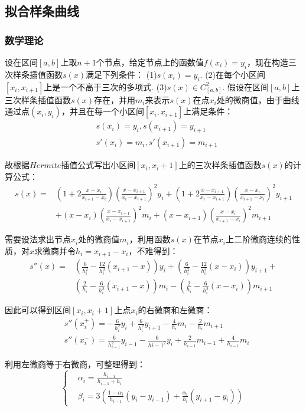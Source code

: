 \documentclass{article}
\begin{document}
	\subsection{拟合样条曲线}
	\subsubsection{数学理论}
	设在区间$[a,b]$上取$n+1$个节点，给定节点上的函数值$f(x_i)=y_i$，现在构造三次样条插值函数$s(x)$满足下列条件：
	(1)$s(x_i)=y_i.$
	(2)在每个小区间$[x_i,x_{i+1}]$上是一个不高于三次的多项式.
	(3)$s(x)∈C_{[a,b]}^2$.
	假设在区间$[a,b]$上三次样条插值函数$s(x)$存在，并用$m_i$来表示$s(x)$在点$x_i$处的微商值，由于曲线通过点$(x_i,y_i)$，并且在每一个小区间$[x_i,x_{i+1}]$上满足条件：
	$$
	\begin{aligned}
		&s(x_i)=y_i,s(x_{i+1})=y_{i+1}\\
		&s'(x_i)=m_i,s'(x_{i+1})=m_{i+1}
	\end{aligned}
	$$
	
	故根据$Hermite$插值公式写出小区间$[x_i,x_i+1]$上的三次样条插值函数$s(x)$的计算公式：
	$$
	\begin{aligned}
		s(x)=&(1+2\frac{x-x_i}{x_{i+1}-x_i})(\frac{x-x_{i+1}}{x_i-x_{i+1}})^2y_i+(1+2\frac{x-x_{i+1}}{x_i-x_{i+1}})(\frac{x-x_i}{x_{i+1}-x_i})^2y_{i+1}
		\\&+(x-x_i)(\frac{x-x_{i+1}}{x_i-x_{i+1}})^2m_i+(x-x_{i+1})(\frac{x-x_i}{x_{i+1}-x_i})^2m_{i+1}
	\end{aligned}
	$$
	
	需要设法求出节点$x_i$处的微商值$m_i$，利用函数$s(x)$在节点$x_i$上二阶微商连续的性质，对$x$求微商并令$h_i=x_{i+1}-x_i$，不难得到：
	$$
	\begin{aligned}
	s''(x)=&(\frac{6}{h_i^2}-\frac{12}{h_i^3}(x_{i+1}-x))y_i+(\frac{6}{h_i^2}-\frac{12}{h_i^3}(x-x_i))y_{i+1}+
	\\
	&(\frac{2}{h_i}-\frac{6}{h_i^2}(x_{i+1}-x))m_i-(\frac{2}{h_i}-\frac{6}{h_i^2}(x-x_i))m_{i+1}
	\end{aligned}
	$$
	
	因此可以得到区间$[x_i,x_i+1]$上点$x_i$的右微商和左微商：
	$$
	\begin{aligned}
		&s''(x_i^+)=-\frac{6}{h_i^2}y_i+\frac{6}{h_i^2}y_{i+1}-\frac{4}{h_i}m_i-\frac{2}{h_i}m_{i+1}\\
		&s''(x_i^-)=\frac{6}{h_{i-1}^2}y_{i-1}-\frac{6}{h{i-1}^2}y_i+\frac{2}{h_{i-1}}m_{i-1}+\frac{4}{h_{i-1}}m_i
	\end{aligned}
	$$
	
	利用左微商等于右微商，可整理得到：
	$$
	\left\{
	\begin{aligned}
		&\alpha_i=\frac{h_{i-1}}{h_{i-1}+h_i}\\
		&\beta_i=3(\frac{1-\alpha_i}{h_{i-1}}(y_i-y_{i-1})+\frac{\alpha_i}{h_{i}}(y_{i+1}-y_i))
	\end{aligned}
	\right.
	$$
	
\end{document}

